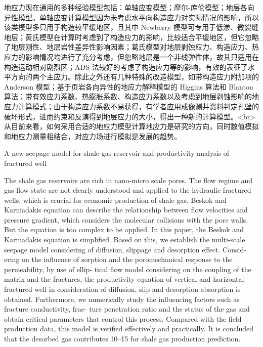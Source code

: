 \documentclass{article}
\begin{document}
\title{}
\author{}
\date{}
\maketitle
地应力现在通用的多种经验模型包括：单轴应变模型；摩尔-库伦模型；地层各向异性模型。单轴应变计算模型因为未考虑水平向构造应力对实际情况的影响，所以该类模型多只用于构造较平缓地区，且其中 Newberry 模型可专用于低渗、微裂缝地层；黄氏模型在计算时考虑到了构造应力的影响，比较适合平缓地区，但它忽略了地层刚性、地层岩性差异性影响因素；葛氏模型对地层剥蚀应力、构造应力、热应力的影响情况均进行了充分考虑，但忽略地层是一个非线弹性体，故其只适用在构造运动相对剧烈区；ADS 法较好的考虑了构造应力等的影响，有效的表征了水平方向的两个主应力。除此之外还有几种特殊的改造模型，如带构造应力附加项的 Anderson 模型；基于页岩各向异性的地应力解释模型的 Higgins 算法和 Blanton 算法；带有效应力系数、热膨胀系数、构造应力系数以及考虑到地层剥蚀影响的地应力计算模式；由于构造应力系数不易获得，有学者应用成像测井资料判定孔壁的破坏形式，进而约束和反演得到地层应力的大小，得出一种新的计算模型。<br>从目前来看，如何采用合适的地应力模型计算地应力是研究的方向，同时数值模拟和地应力测量相结合，对应力场进行模拟是发展的趋势。

A new seepage model for shale gas reservoir and productivity analysis of fractured well

The shale gas reservoirs are rich in nano-micro scale pores. The flow regime and gas flow state are not
clearly understood and applied to the hydraulic fractured wells, which is crucial for economic production
of shale gas. Beskok and Karniadakis equation can describe the relationship between flow velocities and
pressure gradient, which considers the molecular collisions with the pore walls. But the equation is too
complex to be applied. In this paper, the Beskok and Karniadakis equation is simplified. Based on this, we
establish the multi-scale seepage model considering of diffusion, slippage and desorption effect. Consid-
ering on the influence of sorption and the poromechanical response to the permeability, by use of ellip-
tical flow model considering on the coupling of the matrix and the fractures, the productivity equation of
vertical and horizontal fractured well in consideration of diffusion, slip and desorption absorption is
obtained. Furthermore, we numerically study the influencing factors such as fracture conductivity, frac-
ture penetration ratio and the status of the gas and obtain critical parameters that control this process.
Compared with the field production data, this model is verified effectively and practically. It is concluded
that the desorbed gas contributes 10–15%
for shale gas production prediction.
\end{document}
